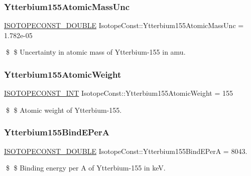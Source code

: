 \subsubsection{\texorpdfstring{Ytterbium155\+Atomic\+Mass\+Unc}{Ytterbium155AtomicMassUnc}}
{\footnotesize\ttfamily \mbox{\hyperlink{group___isotope_const-_macros_ga8f45a7272ce02c0b4c65c44636ed719a}{I\+S\+O\+T\+O\+P\+E\+C\+O\+N\+S\+T\+\_\+\+D\+O\+U\+B\+LE}} Isotope\+Const\+::\+Ytterbium155\+Atomic\+Mass\+Unc = 1.\+782e-\/05}

\$ \$ Uncertainty in atomic mass of Ytterbium-\/155 in amu. \mbox{\label{group___isotope_const-_ytterbium-_yb155_gabac3cfa6c77cba1a47b560cc68e566d2}} 
\subsubsection{\texorpdfstring{Ytterbium155\+Atomic\+Weight}{Ytterbium155AtomicWeight}}
{\footnotesize\ttfamily \mbox{\hyperlink{group___isotope_const-_macros_ga5f18360b3e99483a35c32d789e62621c}{I\+S\+O\+T\+O\+P\+E\+C\+O\+N\+S\+T\+\_\+\+I\+NT}} Isotope\+Const\+::\+Ytterbium155\+Atomic\+Weight = 155}

\$ \$ Atomic weight of Ytterbium-\/155. \mbox{\label{group___isotope_const-_ytterbium-_yb155_ga1804a3ae4fd5031c80457cd8e15dcd20}} 
\subsubsection{\texorpdfstring{Ytterbium155\+Bind\+E\+PerA}{Ytterbium155BindEPerA}}
{\footnotesize\ttfamily \mbox{\hyperlink{group___isotope_const-_macros_ga8f45a7272ce02c0b4c65c44636ed719a}{I\+S\+O\+T\+O\+P\+E\+C\+O\+N\+S\+T\+\_\+\+D\+O\+U\+B\+LE}} Isotope\+Const\+::\+Ytterbium155\+Bind\+E\+PerA = 8043.}

\$ \$ Binding energy per A of Ytterbium-\/155 in keV. \mbox{\label{group___isotope_const-_ytterbium-_yb155_ga1650ed5f15ab06d2371dd3cb0e51c467}} 
